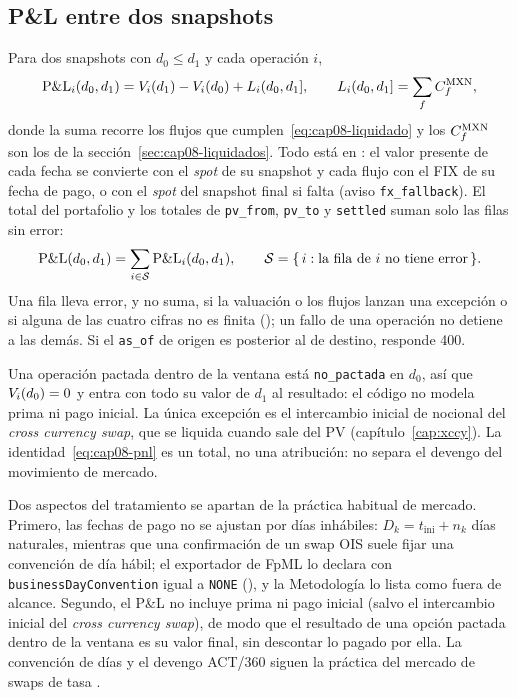 \subsection{P\&L entre dos snapshots}\label{sec:cap08-pnl}

Para dos snapshots con $d_0 \le d_1$ y cada operación $i$,
\begin{equation}\label{eq:cap08-pnl}
  \mathrm{P\&L}_i(d_0, d_1) = V_i(d_1) - V_i(d_0) + L_i(d_0, d_1],
  \qquad
  L_i(d_0, d_1] = \sum_{f} C_f^{\textup{MXN}},
\end{equation}
donde la suma recorre los flujos que cumplen~\eqref{eq:cap08-liquidado} y los $C_f^{\textup{MXN}}$ son los de la sección~\ref{sec:cap08-liquidados}. Todo está en \MXN: el valor presente de cada fecha se convierte con el \emph{spot} de su snapshot y cada flujo con el FIX de su fecha de pago, o con el \emph{spot} del snapshot final si falta (aviso \texttt{fx\_fallback}). El total del portafolio y los totales de \texttt{pv\_from}, \texttt{pv\_to} y \texttt{settled} suman solo las filas sin error:
\begin{equation}\label{eq:cap08-pnl-total}
  \mathrm{P\&L}(d_0, d_1) = \sum_{i \in \mathcal{S}} \mathrm{P\&L}_i(d_0, d_1), \qquad \mathcal{S} = \{\,i : \text{la fila de } i \text{ no tiene error}\,\}.
\end{equation}
Una fila lleva error, y no suma, si la valuación o los flujos lanzan una excepción o si alguna de las cuatro cifras no es finita (); un fallo de una operación no detiene a las demás. Si el \texttt{as\_of} de origen es posterior al de destino,  responde 400.

Una operación pactada dentro de la ventana está \texttt{no\_pactada} en $d_0$, así que $V_i(d_0) = 0$ y entra con todo su valor de $d_1$ al resultado: el código no modela prima ni pago inicial. La única excepción es el intercambio inicial de nocional del \emph{cross currency swap}, que se liquida cuando sale del PV (capítulo~\ref{cap:xccy}). La identidad~\eqref{eq:cap08-pnl} es un total, no una atribución: no separa el devengo del movimiento de mercado.

\begin{diferencia}
  Dos aspectos del tratamiento se apartan de la práctica habitual de mercado. Primero, las fechas de pago no se ajustan por días inhábiles: $D_k = t_{\mathrm{ini}} + n_k$ días naturales, mientras que una confirmación de un swap OIS suele fijar una convención de día hábil; el exportador de FpML lo declara con \texttt{businessDayConvention} igual a \texttt{NONE} (), y la Metodología lo lista como fuera de alcance. Segundo, el P\&L no incluye prima ni pago inicial (salvo el intercambio inicial del \emph{cross currency swap}), de modo que el resultado de una opción pactada dentro de la ventana es su valor final, sin descontar lo pagado por ella. La convención de días y el devengo ACT/360 siguen la práctica del mercado de swaps de tasa \citep{hull2018}.
\end{diferencia}

